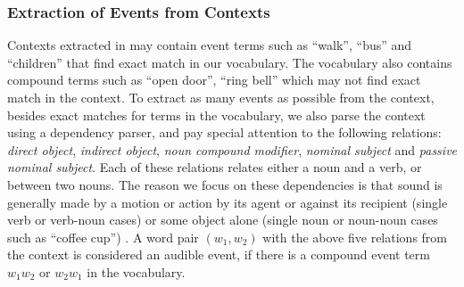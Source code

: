 \subsubsection{Extraction of Events from Contexts}
\label{subsec:lists}
Contexts extracted in  may contain event terms such as ``walk'',
``bus'' and ``children'' that find exact match in our vocabulary.
The vocabulary also contains compound terms such as ``open door'', 
``ring bell'' which may not find exact match in the context. To extract
as many events as possible from the context, besides exact matches for
terms in the vocabulary, we also parse the context using a
dependency parser, and pay special attention to the following relations:
{\em direct object}, {\em indirect object}, {\em noun compound modifier},
{\em nominal subject} and {\em passive nominal subject}.
Each of these relations relates either a noun and a verb, or between
two nouns. The reason we focus on these dependencies is that sound is generally
made by a motion or action by its agent or against its recipient (single verb or 
verb-noun cases) 
or some object alone (single noun or noun-noun cases such as ``coffee cup'') . 
A word pair $(w_1, w_2)$
with the above five relations from the context is considered an audible
event, if there is a compound event term $w_1w_2$ or $w_2w_1$ in the 
vocabulary. 
 
%
%

